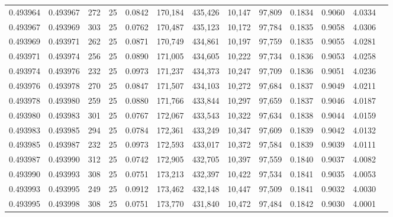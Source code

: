 \begin{tabular}{rrrrrrrrrrrrr}
0.493964 & 0.493967 &   272 &  25 &                                     0.0842 & 170,184 & 435,426 &  10,147 &  97,809 & 0.1834 & 0.9060 & 4.0334 \\
0.493967 & 0.493969 &   303 &  25 &                                     0.0762 & 170,487 & 435,123 &  10,172 &  97,784 & 0.1835 & 0.9058 & 4.0306 \\
0.493969 & 0.493971 &   262 &  25 &                                     0.0871 & 170,749 & 434,861 &  10,197 &  97,759 & 0.1835 & 0.9055 & 4.0281 \\
0.493971 & 0.493974 &   256 &  25 &                                     0.0890 & 171,005 & 434,605 &  10,222 &  97,734 & 0.1836 & 0.9053 & 4.0258 \\
0.493974 & 0.493976 &   232 &  25 &                                     0.0973 & 171,237 & 434,373 &  10,247 &  97,709 & 0.1836 & 0.9051 & 4.0236 \\
0.493976 & 0.493978 &   270 &  25 &                                     0.0847 & 171,507 & 434,103 &  10,272 &  97,684 & 0.1837 & 0.9049 & 4.0211 \\
0.493978 & 0.493980 &   259 &  25 &                                     0.0880 & 171,766 & 433,844 &  10,297 &  97,659 & 0.1837 & 0.9046 & 4.0187 \\
0.493980 & 0.493983 &   301 &  25 &                                     0.0767 & 172,067 & 433,543 &  10,322 &  97,634 & 0.1838 & 0.9044 & 4.0159 \\
0.493983 & 0.493985 &   294 &  25 &                                     0.0784 & 172,361 & 433,249 &  10,347 &  97,609 & 0.1839 & 0.9042 & 4.0132 \\
0.493985 & 0.493987 &   232 &  25 &                                     0.0973 & 172,593 & 433,017 &  10,372 &  97,584 & 0.1839 & 0.9039 & 4.0111 \\
0.493987 & 0.493990 &   312 &  25 &                                     0.0742 & 172,905 & 432,705 &  10,397 &  97,559 & 0.1840 & 0.9037 & 4.0082 \\
0.493990 & 0.493993 &   308 &  25 &                                     0.0751 & 173,213 & 432,397 &  10,422 &  97,534 & 0.1841 & 0.9035 & 4.0053 \\
0.493993 & 0.493995 &   249 &  25 &                                     0.0912 & 173,462 & 432,148 &  10,447 &  97,509 & 0.1841 & 0.9032 & 4.0030 \\
0.493995 & 0.493998 &   308 &  25 &                                     0.0751 & 173,770 & 431,840 &  10,472 &  97,484 & 0.1842 & 0.9030 & 4.0001 \\

\end{tabular}
